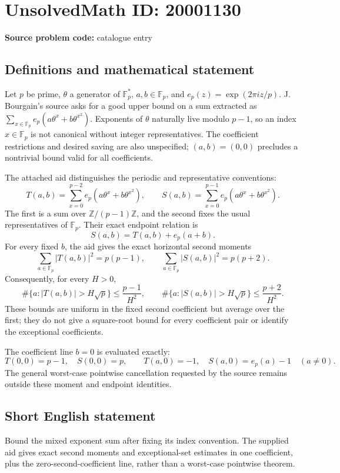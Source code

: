 \documentclass[11pt]{article}
\newcommand{\Z}{\mathbb{Z}}
\newcommand{\F}{\mathbb{F}}
\begin{document}
\section*{UnsolvedMath ID: 20001130}
\textbf{Source problem code:} catalogue entry
\subsection{Definitions and mathematical statement}
Let $p$ be prime, $\theta$ a generator of $\F_p^*$, $a,b\in\F_p$, and $e_p(z)=\exp(2\pi i z/p)$. J. Bourgain's source asks for a good upper bound on a sum extracted as $\sum_{x\in\F_p}e_p(a\theta^x+b\theta^{x^2})$. Exponents of $\theta$ naturally live modulo $p-1$, so an index $x\in\F_p$ is not canonical without integer representatives. The coefficient restrictions and desired saving are also unspecified; $(a,b)=(0,0)$ precludes a nontrivial bound valid for all coefficients.

The attached aid distinguishes the periodic and representative conventions:
\[
T(a,b)=\sum_{x=0}^{p-2}e_p(a\theta^x+b\theta^{x^2}),\qquad
S(a,b)=\sum_{x=0}^{p-1}e_p(a\theta^x+b\theta^{x^2}).
\]
The first is a sum over $\Z/(p-1)\Z$, and the second fixes the usual representatives of $\F_p$. Their exact endpoint relation is
\[
S(a,b)=T(a,b)+e_p(a+b).
\]
For every fixed $b$, the aid gives the exact horizontal second moments
\[
\sum_{a\in\F_p}|T(a,b)|^2=p(p-1),\qquad
\sum_{a\in\F_p}|S(a,b)|^2=p(p+2).
\]
Consequently, for every $H>0$,
\[
\#\{a:|T(a,b)|>H\sqrt p\}\le\frac{p-1}{H^2},\qquad
\#\{a:|S(a,b)|>H\sqrt p\}\le\frac{p+2}{H^2}.
\]
These bounds are uniform in the fixed second coefficient but average over the first; they do not give a square-root bound for every coefficient pair or identify the exceptional coefficients.

The coefficient line $b=0$ is evaluated exactly:
\[
T(0,0)=p-1,\quad S(0,0)=p,\qquad
T(a,0)=-1,\quad S(a,0)=e_p(a)-1\quad(a\ne0).
\]
The general worst-case pointwise cancellation requested by the source remains outside these moment and endpoint identities.
\subsection{Short English statement}
Bound the mixed exponent sum after fixing its index convention. The supplied aid gives exact second moments and exceptional-set estimates in one coefficient, plus the zero-second-coefficient line, rather than a worst-case pointwise theorem.
\end{document}
